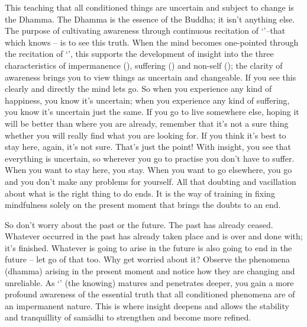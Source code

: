 This teaching that all conditioned things are uncertain and subject to change is the Dhamma. The Dhamma is the essence of the Buddha; it isn't anything else. The purpose of cultivating awareness through continuous recitation of  `'--that which knows -- is to see this truth. When the mind becomes one-pointed through the recitation of `', this supports the development of insight into the three characteristics of impermanence (), suffering () and non-self (); the clarity of awareness brings you to view things as uncertain and changeable. If you see this clearly and directly the mind lets go. So when you experience any kind of happiness, you know it's uncertain; when you experience any kind of suffering, you know it's uncertain just the same. If you go to live somewhere else, hoping it will be better than where you are already, remember that it's not a sure thing whether you will really find what you are looking for. If you think it's best to stay here, again, it's not sure. That's just the point! With insight, you see that everything is uncertain, so wherever you go to practise you don't have to suffer. When you want to stay here, you stay. When you want to go elsewhere, you go and you don't make any problems for yourself. All that doubting and vacillation about what is the right thing to do ends. It is the way of training in fixing mindfulness solely on the present moment that brings the doubts to an end. 

So don't worry about the past or the future. The past has already ceased. Whatever occurred in the past has already taken place and is over and done with; it's finished. Whatever is going to arise in the future is also going to end in the future -- let go of that too. Why get worried about it? Observe the phenomena (dhamma) arising in the present moment and notice how they are changing and unreliable. As `' (the knowing) matures and penetrates deeper, you gain a more profound awareness of the essential truth that all conditioned phenomena are of an impermanent nature. This is where insight deepens and allows the stability and tranquillity of sam\=adhi to strengthen and become more refined.

